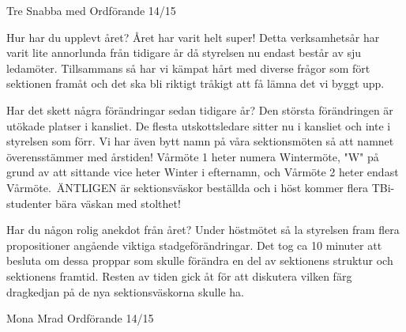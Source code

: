 Tre Snabba med Ordförande 14/15

Hur har du upplevt året?
Året har varit helt super! Detta verksamhetsår har varit lite annorlunda från tidigare år då styrelsen nu endast består av sju ledamöter. Tillsammans så har vi kämpat hårt med diverse frågor som fört sektionen framåt och det ska bli riktigt tråkigt att få lämna det vi byggt upp. 

Har det skett några förändringar sedan tidigare år?
Den största förändringen är utökade platser i kansliet. De flesta utskottsledare sitter nu i kansliet och inte i styrelsen som förr. Vi har även bytt namn på våra sektionsmöten så att namnet överensstämmer med årstiden! Vårmöte 1 heter numera Wintermöte, "W" på grund av att sittande vice heter Winter i efternamn, och Vårmöte 2 heter endast Vårmöte. ÄNTLIGEN är sektionsväskor beställda och i höst kommer flera TBi-studenter bära väskan med stolthet!  

Har du någon rolig anekdot från året?
Under höstmötet så la styrelsen fram flera propositioner angående viktiga stadgeförändringar. Det tog ca 10 minuter att besluta om dessa proppar som skulle förändra en del av sektionens struktur och sektionens framtid.
Resten av tiden gick åt för att diskutera vilken färg dragkedjan på de nya sektionsväskorna skulle ha. 

Mona Mrad
Ordförande 14/15
